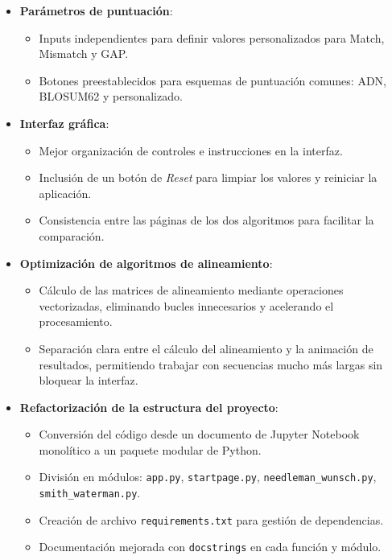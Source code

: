 \documentclass[11pt,a4paper]{article}
\begin{document}
  \begin{itemize}[noitemsep,topsep=0pt,leftmargin=*]
    \item \textbf{Parámetros de puntuación}:
    \begin{itemize}[noitemsep,topsep=0pt]
      \item Inputs independientes para definir valores personalizados para Match, Mismatch y GAP.
      \item Botones preestablecidos para esquemas de puntuación comunes: ADN, BLOSUM62 y personalizado.
    \end{itemize}
    \item \textbf{Interfaz gráfica}:
    \begin{itemize}[noitemsep,topsep=0pt]
      \item Mejor organización de controles e instrucciones en la interfaz.
      \item Inclusión de un botón de \textit{Reset} para limpiar los valores y reiniciar la aplicación.
      \item Consistencia entre las páginas de los dos algoritmos para facilitar la comparación.
    \end{itemize}
    \item \textbf{Optimización de algoritmos de alineamiento}:
    \begin{itemize}[noitemsep,topsep=0pt]
      \item Cálculo de las matrices de alineamiento mediante operaciones vectorizadas, eliminando bucles innecesarios y acelerando el procesamiento.
      \item Separación clara entre el cálculo del alineamiento y la animación de resultados, permitiendo trabajar con secuencias mucho más largas sin bloquear la interfaz.
    \end{itemize}
    \item \textbf{Refactorización de la estructura del proyecto}:
    \begin{itemize}[noitemsep,topsep=0pt]
      \item Conversión del código desde un documento de Jupyter Notebook monolítico a un paquete modular de Python.
      \item División en módulos: \texttt{app.py}, \texttt{startpage.py}, \texttt{needleman\_wunsch.py}, \texttt{smith\_waterman.py}.
      \item Creación de archivo \texttt{requirements.txt} para gestión de dependencias.
      \item Documentación mejorada con \texttt{docstrings} en cada función y módulo.
    \end{itemize}
  \end{itemize}
\end{document}
